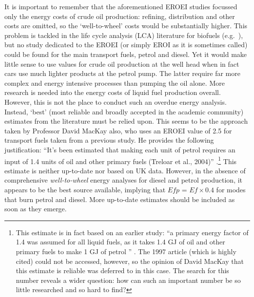 \documentclass[a4paper, 11pt, twoside]{Thesis}
\begin{document}
It is important to
remember that the aforementioned EROEI studies focussed only the energy costs
of crude oil production: refining, distribution and
other costs are omitted, so the `well-to-wheel' costs would be substantially
higher. This problem is tackled in the life cycle analysis (LCA) literature
for biofuels (e.g.~\citealp{cherubini2009energy}), but no study dedicated to the
EROEI (or simply EROI as it is sometimes called) could be found
for the main transport fuels, petrol and diesel. Yet it would make little sense
to use values for crude oil production at the well head when in fact cars use
much lighter products at the petrol pump. The latter require far more complex
and energy intensive processes than pumping the oil alone. More research is
needed into the energy costs of liquid fuel production overall. However, this
is not the place to conduct such an overdue energy analysis. Instead, 
`best' (most reliable and broadly accepted in the
academic community) estimates from the literature must be relied upon.
This seems to be the approach taken by Professor David
MacKay also, who uses an EROEI value of 2.5 for
transport fuels taken from a previous study. He provides the following
justification: ``It’s been estimated
that making each unit of petrol requires an input of 1.4 units of oil and
other primary fuels (Treloar et al., 2004)''
\citep[p.~30]{MacKay2009}.\footnote{This
estimate
is in fact based on an earlier study: ``a primary energy factor
of 1.4 was assumed for all liquid fuels, as it takes 1.4 GJ of oil
and other primary fuels to make 1 GJ of petrol \citep{Treloar1997}''
\citep[p.~46]{Treloar2004}. The 1997 article (which is highly cited)
could not be accessed, however, so the opinion of David MacKay that this
estimate is reliable was deferred to in this case. The search for this number
reveals a wider question: how can such an important number be so little
researched and so hard to find?
}
This estimate is neither up-to-date nor based on UK data. However, in the
absence of comprehensive \emph{well-to-wheel} energy analyses for diesel and
petrol production, it appears to be the best source available, implying that
$Efp$ = $Ef \times 0.4$ for modes that burn petrol and diesel. More up-to-date
estimates should be included as soon as they emerge.
\end{document}

